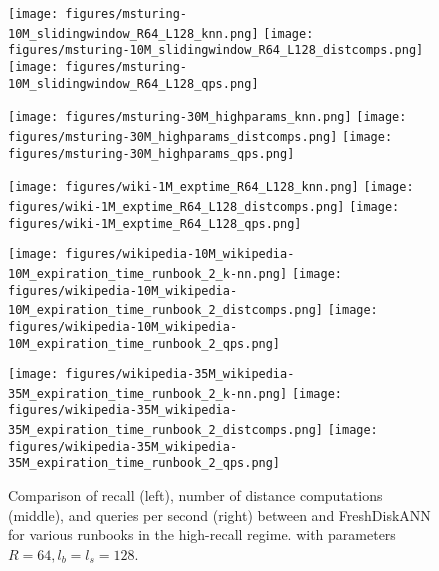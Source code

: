 \begin{figure*}[ht!]
    \centering
    \texttt{[image: figures/msturing-10M\_slidingwindow\_R64\_L128\_knn.png]}
    \hfill
    \texttt{[image: figures/msturing-10M\_slidingwindow\_R64\_L128\_distcomps.png]}
    \hfill
    \texttt{[image: figures/msturing-10M\_slidingwindow\_R64\_L128\_qps.png]}
    \vspace{-10pt}
    
    \centering
    \texttt{[image: figures/msturing-30M\_highparams\_knn.png]}
    \hfill
    \texttt{[image: figures/msturing-30M\_highparams\_distcomps.png]}
    \hfill
    \texttt{[image: figures/msturing-30M\_highparams\_qps.png]}
    \vspace{-5pt}
    
    \centering
    \texttt{[image: figures/wiki-1M\_exptime\_R64\_L128\_knn.png]}
    \hfill
    \texttt{[image: figures/wiki-1M\_exptime\_R64\_L128\_distcomps.png]}
    \hfill
    \texttt{[image: figures/wiki-1M\_exptime\_R64\_L128\_qps.png]}
    \vspace{-5pt}

    \centering
    \texttt{[image: figures/wikipedia-10M\_wikipedia-10M\_expiration\_time\_runbook\_2\_k-nn.png]}
    \hfill
    \texttt{[image: figures/wikipedia-10M\_wikipedia-10M\_expiration\_time\_runbook\_2\_distcomps.png]}
    \hfill
    \texttt{[image: figures/wikipedia-10M\_wikipedia-10M\_expiration\_time\_runbook\_2\_qps.png]}
    \vspace{-5pt}

    \centering
    \texttt{[image: figures/wikipedia-35M\_wikipedia-35M\_expiration\_time\_runbook\_2\_k-nn.png]}
    \hfill
    \texttt{[image: figures/wikipedia-35M\_wikipedia-35M\_expiration\_time\_runbook\_2\_distcomps.png]}
    \hfill
    \texttt{[image: figures/wikipedia-35M\_wikipedia-35M\_expiration\_time\_runbook\_2\_qps.png]}
    \vspace{-10pt}

    \caption{Comparison of recall (left), number of distance computations (middle), and queries per second (right)
    between \name and FreshDiskANN for various runbooks in the high-recall regime.
    with parameters $R=64, l_b=l_s=128$.
    }
    \label{fig:highrecallplots}
\end{figure*}